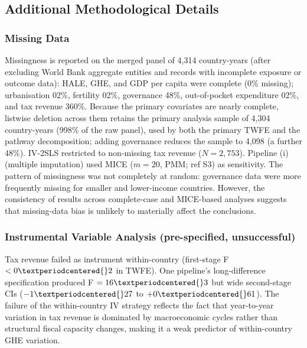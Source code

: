 \documentclass[10pt,a4paper]{article}
\begin{document}
\subsection{Additional Methodological Details}
\subsubsection{Missing Data}
Missingness is reported on the merged panel of 4,314 country-years (after excluding World Bank aggregate entities and records with incomplete exposure or outcome data): HALE, GHE, and GDP per capita were complete (0\% missing); urbanisation 0{\textperiodcentered{}}2\%, fertility 0{\textperiodcentered{}}2\%, governance 4{\textperiodcentered{}}8\%, out-of-pocket expenditure 0{\textperiodcentered{}}2\%, and tax revenue 36{\textperiodcentered{}}0\%. Because the primary covariates are nearly complete, listwise deletion across them retains the primary analysis sample of 4,304 country-years (99{\textperiodcentered{}}8\% of the raw panel), used by both the primary TWFE and the pathway decomposition; adding governance reduces the sample to 4,098 (a further 4{\textperiodcentered{}}8\%). IV-2SLS restricted to non-missing tax revenue ($N = 2{,}753$). Pipeline (i) (multiple imputation) used MICE ($m = 20$, PMM; ref S3) as sensitivity. The pattern of missingness was not completely at random: governance data were more frequently missing for smaller and lower-income countries. However, the consistency of results across complete-case and MICE-based analyses suggests that missing-data bias is unlikely to materially affect the conclusions.

\subsubsection{Instrumental Variable Analysis (pre-specified, unsuccessful)}
Tax revenue failed as instrument within-country (first-stage F $< 0{\textperiodcentered{}}2$ in TWFE). One pipeline's long-difference specification produced F $= 16{\textperiodcentered{}}3$ but wide second-stage CIs ($-1{\textperiodcentered{}}27$ to $+0{\textperiodcentered{}}61$). The failure of the within-country IV strategy reflects the fact that year-to-year variation in tax revenue is dominated by macroeconomic cycles rather than structural fiscal capacity changes, making it a weak predictor of within-country GHE variation.
\end{document}
